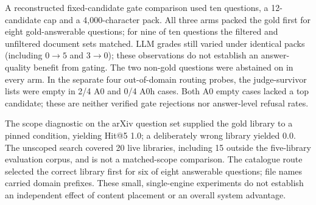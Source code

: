A reconstructed fixed-candidate gate comparison used ten questions, a
12-candidate cap and a 4,000-character pack. All three arms packed the gold
first for eight gold-answerable questions; for nine of ten questions the
filtered and unfiltered document sets matched. LLM grades still varied under
identical packs (including $0\to5$ and $3\to0$); these observations do not
establish an answer-quality benefit from gating. The two non-gold questions
were abstained on in every arm. In the separate four out-of-domain routing
probes, the judge-survivor lists were empty in 2/4 A0 and 0/4 A0h cases.
Both A0 empty cases lacked a top candidate; these are neither verified gate
rejections nor answer-level refusal rates.

The scope diagnostic on the arXiv question set supplied the gold library to a
pinned condition, yielding Hit@5 1.0; a deliberately wrong library yielded
0.0. The unscoped search covered 20 live libraries, including 15 outside the
five-library evaluation corpus, and is not a matched-scope comparison. The
catalogue route selected the correct library first for six of eight
answerable questions; file names carried domain prefixes. These small,
single-engine experiments do not establish an independent effect of content
placement or an overall system advantage.
